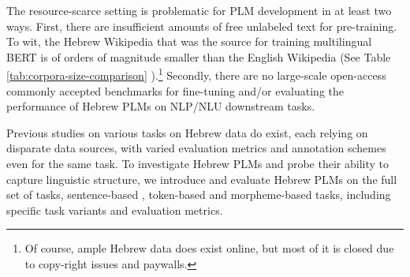 \documentclass[11pt,a4paper]{article}
\begin{document}
The resource-scarce setting is problematic for PLM development in at least two ways. First, there are insufficient amounts of free unlabeled text for pre-training. To wit, the Hebrew Wikipedia that was the source for training multilingual BERT is of orders of magnitude smaller than the English Wikipedia (See Table \ref{tab:corpora-size-comparison} ).\footnote{Of course, ample Hebrew data does exist online, but most of it is closed due to copy-right issues and paywalls.}  Secondly, there are no large-scale open-access   commonly accepted benchmarks for fine-tuning and/or evaluating the performance of Hebrew PLMs on NLP/NLU downstream tasks. 

Previous studies on various tasks on Hebrew data do exist, each relying on disparate data sources, with varied evaluation metrics and annotation schemes even for the same task.
To investigate Hebrew PLMs and probe their ability to capture linguistic structure, 
we introduce and evaluate Hebrew PLMs on the full set of tasks, sentence-based ,
token-based and morpheme-based tasks, including specific task variants and evaluation metrics.







\begin{table}[t]
\centering
{}
\caption{
Corpora Size Comparison: High-resource (and Medium-resourced) languages vs.\ Hebrew.
  }\label{tab:corpora-size-comparison}  
  \vspace{-0.05in}
\end{table}


\begin{table}[t]
\centering
{}
\caption{
Data Statistics for AlephBERT's training sets.
  }\label{tab:data-stats} 
  \vspace{-0.05in}
\end{table}
\end{document}

